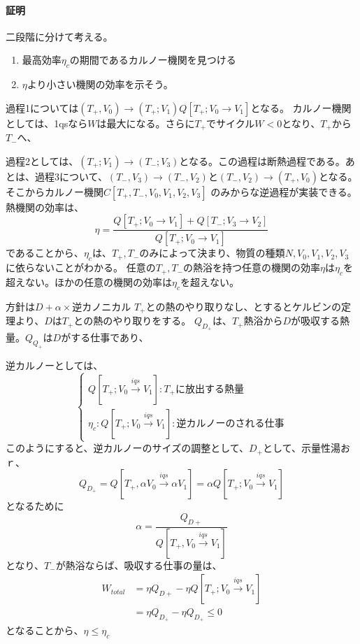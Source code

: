 \documentclass{ltjsarticle}
\begin{document}
\paragraph{証明}
二段階に分けて考える。
\begin{enumerate}
  \item 最高効率\(\eta_c\)の期間であるカルノー機関を見つける
  \item \(\eta\)より小さい機関の効率を示そう。
\end{enumerate}
過程1については\((T_+,V_0)\to (T_+;V_1)\)\(Q[T_+; V_0 \to V_1]\)となる。
カルノー機関としては、1qsなら\(W\)は最大になる。さらに\(T_+\)でサイクル\(W<0\)となり、\(T_+\)から\(T_-\)へ、

過程2としては、\((T_+;V_1)\to (T_-;V_3)\)となる。この過程は断熱過程である。あとは、過程3について、\((T_-,V_3)\to (T_-,V_2)\)と\((T_-,V_2)\to (T_+,V_0)\)となる。そこからカルノー機関\(C[T_+,T_-,V_0,V_1,V_2,V_3]\)
のみからな逆過程が実装できる。
熱機関の効率は、
\begin{equation}
  \eta = \frac{Q[T_+;V_0\to V_1]+ Q[T_-;V_3\to V_2]}{Q[T_+;V_0\to V_1]}
\end{equation}
であることから、\(\eta_c\)は、\(T_+,T_-\)のみによって決まり、物質の種類\(N,V_0,V_1,V_2,V_3\)に依らないことがわかる。
任意の\(T_+,T_-\)の熱浴を持つ任意の機関の効率\(\eta\)は\(\eta_c\)を超えない。ほかの任意の機関の効率は\(\eta_c\)を超えない。

方針は\(D+\alpha \times \text{逆カノニカル}\)
\(T_+\)との熱のやり取りなし、とするとケルビンの定理より、\(D\)は\(T_+\)との熱のやり取りをする。
\(Q_{D_+}\)は、\(T_+\)熱浴から\(D\)が吸収する熱量。\(Q_{Q_+}\)は\(D\)がする仕事であり、

逆カルノーとしては、
\begin{equation}
  \begin{cases}
    Q[T_+;V_0\xrightarrow{iqs}V_1] :  T_+\text{に放出する熱量} \\
    \eta_c : Q[T_+;V_0 \xrightarrow{iqs}V_1] : 逆カルノーのされる仕事
  \end{cases}
\end{equation}
このようにすると、逆カルノーのサイズの調整として、\(D_+\)として、示量性湯おｒ、
\begin{equation}
  Q_{D_+} = Q[T_+,\alpha V_0 \xrightarrow{iqs} \alpha V_1] = \alpha Q[T_+;V_0\xrightarrow{iqs}V_1]
\end{equation}
となるために
\begin{equation}
  \alpha = \frac{Q_{D+}}{Q[T_+,V_0 \xrightarrow{iqs}V_1]}
\end{equation}
となり、\(T_-\)が熱浴ならば、吸収する仕事の量は、
\begin{align}
  W_{total} & = \eta  Q_{D+} - \eta Q[T_+;V_0\xrightarrow{iqs}V_1]\\
  & = \eta Q_{D_+} - \eta Q_{D_+} \le 0
\end{align}
となることから、\(\eta \le \eta_c\)
\end{document}
